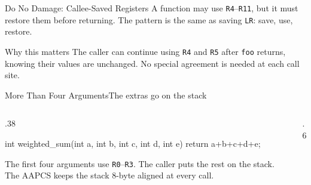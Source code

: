 \documentclass[9pt,aspectratio=169,xcolor=table]{beamer}
\begin{document}
\begin{frame}[fragile]{Do No Damage: Callee-Saved Registers}
	\leavevmode
	{\small
    			A function may use \texttt{R4}--\texttt{R11}, but it must restore
    			them before returning. The pattern is the same as saving
    			\texttt{LR}: \alert{save, use, restore}.}

    \vspace{2mm}

    \vspace{2mm}
\begin{block}{Why this matters} The caller can continue using \texttt{R4} and \texttt{R5} after \texttt{foo} returns, knowing their values are unchanged. No special agreement is needed at each call site. \end{block}
\end{frame}

\begin{frame}[fragile]{More Than Four Arguments}{The extras go on the stack}
    \begin{columns}[T]
    \begin{column}{.38\textwidth}
\begin{cc}[basicstyle=\ttfamily\footnotesize]
int weighted_sum(int a, int b,
                 int c, int d,
                 int e) {
    return a+b+c+d+e;
}
\end{cc}
        \vspace{1mm}
        {\small The first four arguments use \texttt{R0}--\texttt{R3}. The caller puts the rest on the stack. The AAPCS keeps the stack \alert{8-byte aligned} at every call.}
    \end{column}
    \begin{column}{.6\textwidth}
    \end{column}
    \end{columns}
\end{frame}
\end{document}
